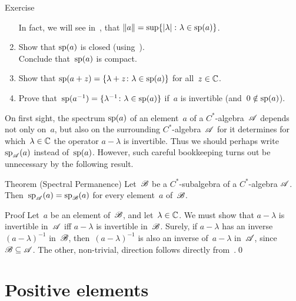 \documentclass[a]{subfiles}
\begin{document}
\begin{parsec}
\begin{point}{Exercise}
\begin{enumerate}
In fact, we will see in~,
that $\|a\|=\sup\{\left|\lambda\right|\colon \lambda\in \mathrm{sp}(a)\}$.
\item
Show that $\mathrm{sp}(a)$ is closed (using~).\\
Conclude that~$\mathrm{sp}(a)$ is compact.
\item
Show that $\mathrm{sp}(a+z)=\{\lambda+z\colon \lambda\in\mathrm{sp}(a)\}$
for all~$z\in \mathbb{C}$.
\item
Prove that~$\mathrm{sp}(a^{-1})=\{\lambda^{-1}\colon \lambda\in \mathrm{sp}(a)\}$
if~$a$ is invertible (and~$0\notin \mathrm{sp}(a)$).
\end{enumerate}
\end{point}
\begin{point}%
On first sight,
the spectrum $\mathrm{sp}(a)$
of an element~$a$ of a $C^*$-algebra~$\mathscr{A}$ 
depends not only on~$a$,
but also on the surrounding $C^*$-algebra~$\mathscr{A}$ for it determines
for which~$\lambda\in\mathbb{C}$ the operator $a-\lambda$ is invertible.
Thus we should perhaps write $\mathrm{sp}_{\mathscr{A}}(a)$ instead
of~$\mathrm{sp}(a)$.
However, such careful bookkeeping turns out 
be unnecessary
by the following result.
\end{point}
\begin{point}{Theorem (Spectral Permanence)}%
%
Let~$\mathscr{B}$ be a $C^*$-subalgebra of a $C^*$-algebra $\mathscr{A}$.
Then~$\mathrm{sp}_{\mathscr{A}}(a)=\mathrm{sp}_{\mathscr{B}}(a)$
for every element~$a$ of~$\mathscr{B}$.
\begin{point}{Proof}%
Let~$a$ be an element of~$\mathscr{B}$,
and let~$\lambda\in \mathbb{C}$.
We must show that $a-\lambda$ is invertible in~$\mathscr{A}$
iff $a-\lambda$ is invertible in~$\mathscr{B}$.
Surely,
if $a-\lambda$ has an inverse $(a-\lambda)^{-1}$ in~$\mathscr{B}$,
then~$(a-\lambda)^{-1}$ is also an inverse of~$a-\lambda$ in~$\mathscr{A}$,
since~$\mathscr{B}\subseteq \mathscr{A}$.
The other, non-trivial, direction follows
directly from~.\qed%
\end{point}
\end{point}
\end{parsec}
\section{Positive elements}
\end{document}

